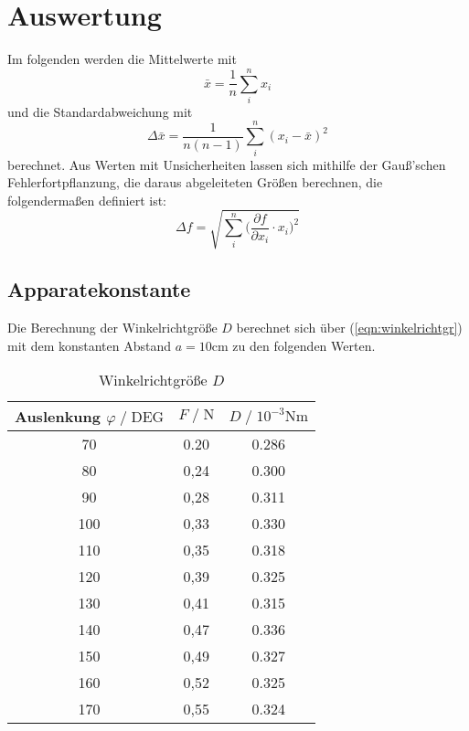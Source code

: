 \section{Auswertung}
\label{sec:Auswertung}

Im folgenden werden die Mittelwerte mit
\begin{equation}
  \label{eqn:mittelwert}
  \bar x = \frac 1n \sum_i^n x_i
\end{equation}
und die Standardabweichung mit
\begin{equation}
  \label{eqn:stdabweichung}
  \Delta\bar x = \frac{1}{n(n-1)}\sum_i^n (x_i- \bar x)^2
\end{equation}
berechnet.
Aus Werten mit Unsicherheiten lassen sich mithilfe der Gauß'schen Fehlerfortpflanzung, die daraus abgeleiteten Größen berechnen, die
folgendermaßen definiert ist:
\begin{equation}
  \label{eqn:gauß}
  \Delta f= \sqrt{\sum_i^n \Big(\frac{\partial f}{\partial x_i}\cdot x_i \Big)^2}
\end{equation}


\subsection{Apparatekonstante}
\label{sec:Apparatekonstante}
Die Berechnung der Winkelrichtgröße $D$ berechnet sich über (\autoref{eqn:winkelrichtgr}) mit dem konstanten Abstand 
$a= 10\si{\centi\meter}$ zu den folgenden Werten.

\begin{table}
  \centering
  \caption{Winkelrichtgröße $D$}
  \label{tab:winkelrichtgroesse}
  \begin{tabular}{c c c}
      \toprule
      Auslenkung $ \varphi \;/\; \text{DEG}$ & $F \;/\; \si{\newton}$ & $D \;/\; 10^{-3}\si{\newton\meter}$\\
      \midrule
      70 & 0.20 & 0.286 \\
      80 & 0,24 & 0.300 \\
      90 & 0,28 & 0.311 \\
      100 & 0,33 & 0.330 \\
      110 & 0,35 & 0.318 \\
      120 & 0,39 & 0.325 \\ 
      130 & 0,41 & 0.315 \\
      140 & 0,47 & 0.336 \\
      150 & 0,49 & 0.327 \\
      160 & 0,52 & 0.325 \\
      170 & 0,55 & 0.324 \\
      \bottomrule
  \end{tabular}
\end{table}

